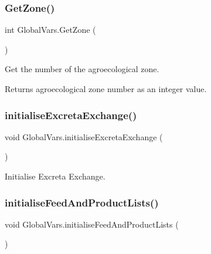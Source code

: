 \subsubsection{\texorpdfstring{GetZone()}{GetZone()}}
{\footnotesize\ttfamily int Global\+Vars.\+Get\+Zone (\begin{DoxyParamCaption}{ }\end{DoxyParamCaption})\hspace{0.3cm}{\ttfamily [inline]}}



Get the number of the agroecological zone. 

\begin{DoxyReturn}{Returns}
agroecological zone number as an integer value. 
\end{DoxyReturn}
\mbox{\label{class_global_vars_ac5574c4c8e6b42592e74966bd08e5b9f}} 
\subsubsection{\texorpdfstring{initialiseExcretaExchange()}{initialiseExcretaExchange()}}
{\footnotesize\ttfamily void Global\+Vars.\+initialise\+Excreta\+Exchange (\begin{DoxyParamCaption}{ }\end{DoxyParamCaption})\hspace{0.3cm}{\ttfamily [inline]}}



Initialise Excreta Exchange. 

\mbox{\label{class_global_vars_af10abdb4f5f605edc5d550ec70e38b56}} 
\subsubsection{\texorpdfstring{initialiseFeedAndProductLists()}{initialiseFeedAndProductLists()}}
{\footnotesize\ttfamily void Global\+Vars.\+initialise\+Feed\+And\+Product\+Lists (\begin{DoxyParamCaption}{ }\end{DoxyParamCaption})\hspace{0.3cm}{\ttfamily [inline]}}



